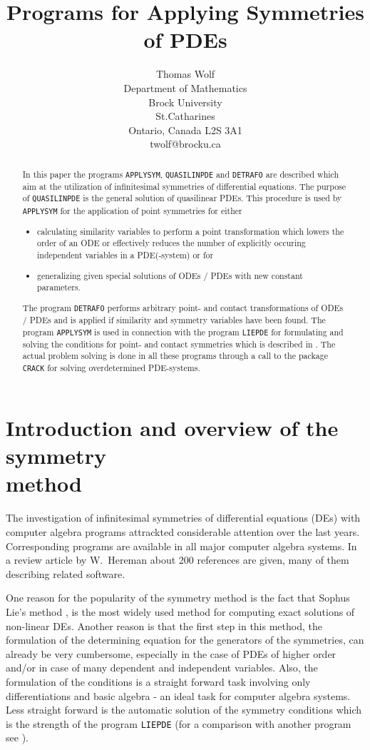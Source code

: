 \documentclass[12pt]{article}
\title{Programs for Applying Symmetries of PDEs}
\author{Thomas Wolf \\                        
        Department of Mathematics \\
        Brock University \\
        St.Catharines \\
        Ontario, Canada L2S 3A1 \\
        twolf@brocku.ca}
\begin{document}
\maketitle
\begin{abstract}
In this paper the programs {\tt APPLYSYM}, {\tt QUASILINPDE} and
{\tt DETRAFO} are described which aim at the utilization
of infinitesimal symmetries of differential equations. The purpose
of {\tt QUASILINPDE} is the general solution of
quasilinear PDEs. This procedure is used by {\tt APPLYSYM}
for the application of point symmetries for either
\begin{itemize}
\item calculating similarity variables to perform a point transformation
which lowers the order of an ODE or effectively reduces the number of
explicitly occuring independent variables in a PDE(-system) or for
\item generalizing given special solutions of ODEs / PDEs with new constant
parameters.
\end{itemize}

The program {\tt DETRAFO} performs arbitrary point- and contact
transformations of ODEs / PDEs and is applied if similarity
and symmetry variables have been found.
The program {\tt APPLYSYM} is used in connection with the program
{\tt LIEPDE} for formulating and solving the conditions for point- and
contact symmetries which is described in \cite{LIEPDE}.
The actual problem solving is done in all these programs through a call
to the package {\tt CRACK} for solving overdetermined PDE-systems.
\end{abstract}

\tableofcontents
\section{Introduction and overview of the symmetry \\ method}
The investigation of infinitesimal symmetries of differential equations
(DEs) with computer algebra programs attrackted considerable attention
over the last years. Corresponding programs are available in all
major computer algebra systems. In a review article by W.\ Hereman
\cite{WHer} about 200 references are given, many of them describing related
software.

One reason for the popularity of the symmetry method
is the fact that Sophus Lie's method
\cite{lie1},\cite{lie2} is the most widely
used method for computing exact solutions of non-linear DEs. Another reason is
that the first step in this
method, the formulation of the determining equation for the generators
of the symmetries, can already be very cumbersome, especially in the
case of PDEs of higher order and/or in case of many dependent and independent
variables. Also, the formulation of the conditions is a straight forward
task involving only differentiations and basic algebra - an ideal task for
computer algebra systems. Less straight forward is the automatic solution
of the symmetry conditions which is the strength of the program {\tt LIEPDE}
(for a comparison with another program see \cite{LIEPDE}).
\end{document}
